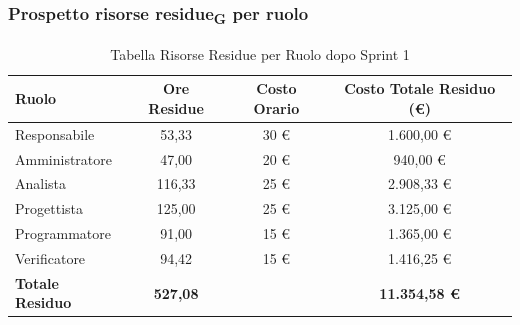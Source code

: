 \subsubsection{Prospetto risorse residue\textsubscript{G} per ruolo}
\begin{table}[H]
    \centering
    \renewcommand{\arraystretch}{1.3}
    \begin{tabularx}{\textwidth}{|X|c|c|c|}
        \hline
        \textbf{Ruolo} & \textbf{Ore Residue} & \textbf{Costo Orario} & \textbf{Costo Totale Residuo (\euro)} \\
        \hline
        Responsabile & 53,33 & 30 \euro & 1.600,00 \euro \\
        Amministratore & 47,00 & 20 \euro & 940,00 \euro \\
        Analista & 116,33 & 25 \euro & 2.908,33 \euro \\
        Progettista & 125,00 & 25 \euro & 3.125,00 \euro \\
        Programmatore & 91,00 & 15 \euro & 1.365,00 \euro \\
        Verificatore & 94,42 & 15 \euro & 1.416,25 \euro \\
        \hline
        \textbf{Totale Residuo} & \textbf{527,08} & & \textbf{11.354,58 \euro} \\
        \hline
    \end{tabularx}
    \caption{Tabella Risorse Residue per Ruolo dopo Sprint 1}
\end{table}

